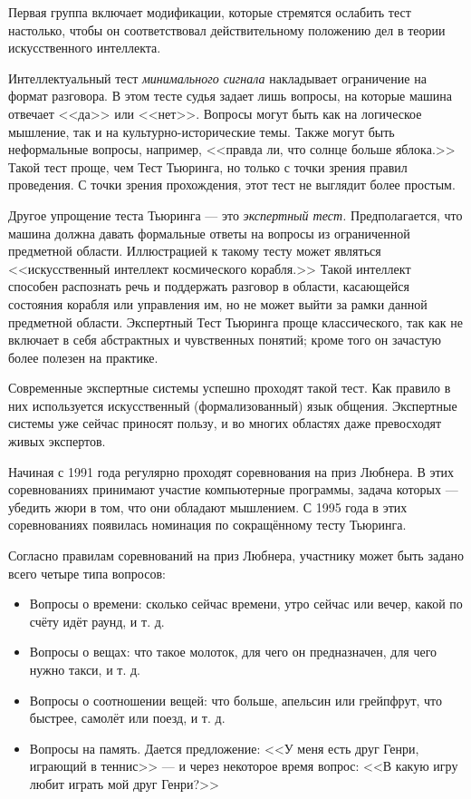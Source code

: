 \documentclass[a4paper,14pt]{scrartcl}
\begin{document}
Первая группа включает модификации, которые стремятся ослабить тест настолько, чтобы он соответствовал действительному положению дел в теории искусственного интеллекта.

Интеллектуальный тест {\it минимального сигнала} накладывает ограничение на формат разговора. В этом тесте судья задает лишь вопросы, на которые машина отвечает <<да>> или <<нет>>. Вопросы могут быть как на логическое мышление, так и на культурно-исторические темы. Также могут быть неформальные вопросы, например, <<правда ли, что солнце больше яблока.>> Такой тест проще, чем Тест Тьюринга, но только с точки зрения правил проведения. С точки зрения прохождения, этот тест не выглядит более простым.

Другое упрощение теста Тьюринга — это {\it экспертный тест.} Предполагается, что машина должна давать формальные ответы на вопросы из ограниченной предметной области. Иллюстрацией к такому тесту может являться <<искусственный интеллект космического корабля.>> Такой интеллект способен распознать речь и поддержать разговор в области, касающейся состояния корабля или управления им, но не может выйти за рамки данной предметной области. Экспертный Тест Тьюринга проще классического, так как не включает в себя абстрактных и чувственных понятий; кроме того он зачастую более полезен на практике. 

Современные экспертные системы успешно проходят такой тест. Как правило в них используется искусственный (формализованный) язык общения. Экспертные системы уже сейчас приносят пользу, и во многих областях даже превосходят живых экспертов.

Начиная с 1991 года регулярно проходят соревнования на приз Любнера. В этих соревнованиях принимают участие компьютерные программы, задача которых --- убедить жюри в том, что они обладают мышлением. С 1995 года в этих соревнованиях появилась номинация по сокращённому тесту Тьюринга. 

Согласно правилам соревнований на приз Любнера, участнику может быть задано всего четыре типа вопросов:
\begin{itemize}
  \item Вопросы о времени: сколько сейчас времени, утро сейчас или вечер, какой по счёту идёт раунд, и т. д.
  \item Вопросы о вещах: что такое молоток, для чего он предназначен, для чего нужно такси, и т. д.
  \item Вопросы о соотношении вещей: что больше, апельсин или грейпфрут, что быстрее, самолёт или поезд, и т. д.
  \item Вопросы на память. Дается предложение: <<У меня есть друг Генри, играющий в теннис>> --- и через некоторое время вопрос: <<В какую игру любит играть мой друг Генри?>>
\end{itemize}
\end{document}
